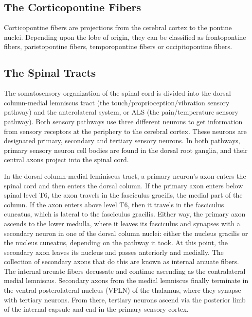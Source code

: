 \documentclass[]{book}
\begin{document}
\hypertarget{the-corticopontine-fibers}{%
\subsection{The Corticopontine Fibers}\label{the-corticopontine-fibers}}

Corticopontine fibers are projections from the cerebral cortex to the pontine nuclei. Depending upon the lobe of origin, they can be classified as frontopontine fibers, parietopontine fibers, temporopontine fibers or occipitopontine fibers.

\hypertarget{the-spinal-tracts}{%
\subsection{The Spinal Tracts}\label{the-spinal-tracts}}

The somatosensory organization of the spinal cord is divided into the dorsal column-medial lemniscus tract (the touch/proprioception/vibration sensory pathway) and the anterolateral system, or ALS (the pain/temperature sensory pathway). Both sensory pathways use three different neurons to get information from sensory receptors at the periphery to the cerebral cortex. These neurons are designated primary, secondary and tertiary sensory neurons. In both pathways, primary sensory neuron cell bodies are found in the dorsal root ganglia, and their central axons project into the spinal cord.

In the dorsal column-medial leminiscus tract, a primary neuron's axon enters the spinal cord and then enters the dorsal column. If the primary axon enters below spinal level T6, the axon travels in the fasciculus gracilis, the medial part of the column. If the axon enters above level T6, then it travels in the fasciculus cuneatus, which is lateral to the fasciculus gracilis. Either way, the primary axon ascends to the lower medulla, where it leaves its fasciculus and synapses with a secondary neuron in one of the dorsal column nuclei: either the nucleus gracilis or the nucleus cuneatus, depending on the pathway it took. At this point, the secondary axon leaves its nucleus and passes anteriorly and medially. The collection of secondary axons that do this are known as internal arcuate fibers. The internal arcuate fibers decussate and continue ascending as the contralateral medial lemniscus. Secondary axons from the medial lemniscus finally terminate in the ventral posterolateral nucleus (VPLN) of the thalamus, where they synapse with tertiary neurons. From there, tertiary neurons ascend via the posterior limb of the internal capsule and end in the primary sensory cortex.
\end{document}
